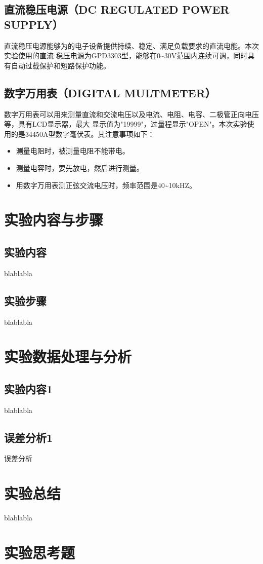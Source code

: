 \documentclass[a4paper,11pt,UTF8]{ctexart}
\begin{document}
\subsection{直流稳压电源（DC REGULATED POWER SUPPLY）}
直流稳压电源能够为的电子设备提供持续、稳定、满足负载要求的直流电能。本次实验使用的直流
稳压电源为GPD3303型，能够在0\~{}30V范围内连续可调，同时具有自动过载保护和短路保护功能。
\subsection{数字万用表（DIGITAL MULTMETER）}
数字万用表可以用来测量直流和交流电压以及电流、电阻、电容、二极管正向电压等，具有LCD显示器，最大
显示值为"19999"，过量程显示"OPEN"。本次实验使用的是34450A型数字毫伏表。其注意事项如下：
\begin{itemize}
  \item 测量电阻时，被测量电阻不能带电。
  \item 测量电容时，要先放电，然后进行测量。
  \item 用数字万用表测正弦交流电压时，频率范围是40\~{}10kHZ。
\end{itemize}
\section{实验内容与步骤}
\subsection{实验内容}
	blablabla
\subsection{实验步骤}
	blablabla

\section{实验数据处理与分析}
\subsection{实验内容1}
	blablabla
\subsection{误差分析1}
	误差分析

\section{实验总结}
blablabla
\section{实验思考题}
\end{document}
